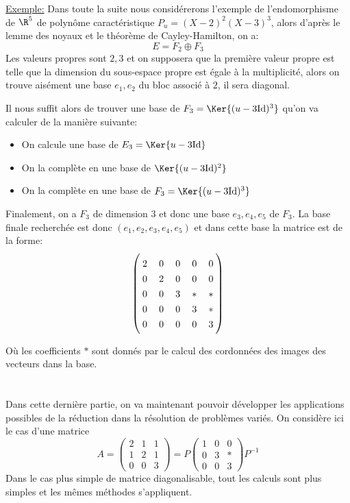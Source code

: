 \underline{Exemple:} Dans toute la suite nous considérerons l'exemple de l'endomorphisme de \(\R^5\) de polynôme caractéristique \(P_u = (X - 2)^2(X - 3)^3\), alors d'après le lemme des noyaux et le théorème de Cayley-Hamilton, on a:
\[
   E = F_2 \oplus F_3 
\]
Les valeurs propres sont \(2, 3\) et on supposera que la première valeur propre est telle que la dimension du sous-espace propre est égale à la multiplicité, alors on trouve aisément une base \(e_1, e_2\) du bloc associé à \(2\), il sera diagonal.\< 

Il nous suffit alors de trouver une base de \(F_3 = \Ker{(u - 3\text{Id})^3}\) qu'on va calculer de la manière suivante:
\begin{itemize}
   \item On calcule une base de \(E_3 = \Ker{u - 3\text{Id}}\)
   \item On la complète en une base de \(\Ker{(u - 3\text{Id})^2}\)
   \item On la complète en une base de \(F_3 = \Ker{(u - 3\text{Id})^3}\)
\end{itemize}
Finalement, on a \(F_3\) de dimension \(3\) et donc une base \(e_3, e_4, e_5\) de \(F_3\). La base finale recherchée est donc \((e_1, e_2, e_3, e_4, e_5)\) et dans cette base la matrice est de la forme:
\[
   \begin{tikzpicture}[every left delimiter/.style={xshift=2mm},
         every right delimiter/.style={xshift=-2mm}]
      \path (0,0) node (mat) [matrix,matrix of math nodes,left delimiter=(,right delimiter=),column sep=2mm,row sep=1mm]
      {
      2 & 0 & 0 & 0 & 0\\
      0 & 2 & 0 & 0 & 0\\
      0 & 0 & 3 & * & *\\
      0 & 0 & 0 & 3 & *\\
      0 & 0 & 0 & 0 & 3\\
      };
   \end{tikzpicture}
\]
Où les coefficients \(*\) sont donnés par le calcul des cordonnées des images des vecteurs dans la base. 
\chapter*{}
Dans cette dernière partie, on va maintenant pouvoir développer les applications possibles de la réduction dans la résolution de problèmes variés. On considère ici le cas d'une matrice 
\[
   A = \begin{pmatrix}
      2 & 1 & 1 \\
      1 & 2 & 1 \\
      0 & 0 & 3
   \end{pmatrix} = P \begin{pmatrix}
      1 & 0 & 0 \\
      0 & 3 & * \\
      0 & 0 & 3
   \end{pmatrix} P^{-1}
\]
Dans le cas plus simple de matrice diagonalisable, tout les calculs sont plus simples et les mêmes méthodes s'appliquent.

